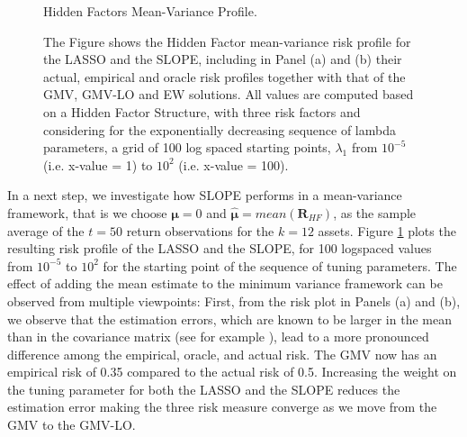 \documentclass[12pt, a4paper]{article}
\begin{document}
\begin{figure}[h!]
\centering
\caption{Hidden Factors Mean-Variance Profile.}\label{RiskProfile_HiddenFactors_MeanVar}
\captionsetup{font=scriptsize,labelfont=scriptsize, width=\textwidth}
     \caption*{The Figure shows the Hidden Factor mean-variance risk profile for the LASSO and the SLOPE, including in Panel (a) and (b) their actual, empirical and oracle risk profiles together with that of the GMV, GMV-LO and EW solutions. %
All values are computed based on a Hidden Factor Structure, with three risk factors and considering for the exponentially decreasing sequence of lambda parameters, a grid of 100 log spaced starting points, $\lambda_{1}$ from $10^{-5}$ (i.e. x-value = 1) to $10^{2}$ (i.e. x-value = 100).}
\end{figure}
%
\noindent
In a next step, we investigate how SLOPE performs in a mean-variance framework, that is we choose $\boldsymbol{\mu} = 0$ and $\boldsymbol{\hat{\mu}} = mean(\boldsymbol{R}_{HF})$, as the sample average of the $t=50$ return observations for the $k=12$ assets. Figure \ref{RiskProfile_HiddenFactors_MeanVar} plots the resulting risk profile of the LASSO and the SLOPE, for 100 logspaced values from $10^{-5}$ to $10^{2}$ for the starting point of the sequence of tuning parameters. The effect of adding the mean estimate to the minimum variance framework can be observed from multiple viewpoints:
First, from the risk plot in Panels (a) and (b), we observe that the estimation errors, which are known to be larger in the mean than in the covariance matrix (see for example \cite{Merton1980, Michaud1989, DeMiguel2009a}), lead to a more pronounced difference among the empirical, oracle, and actual risk.
The GMV now has an empirical risk of 0.35 compared to the actual risk of 0.5. Increasing the weight on the tuning parameter for both the LASSO and the SLOPE reduces the estimation error making the three risk measure converge as we move from the GMV to the GMV-LO.\\
\end{document}

